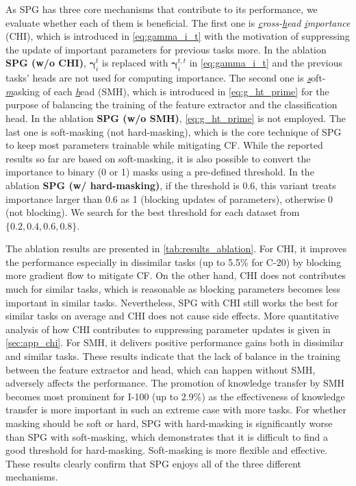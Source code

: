 As SPG has three core mechanisms that contribute to its performance, we evaluate whether each of them is beneficial.
The first one is \textit{\underline{c}ross-\underline{h}ead \underline{i}mportance} (CHI), which is introduced in \cref{eq:gamma_i_t} with the motivation of suppressing the update of important parameters for previous tasks more. In the ablation \textbf{SPG (w/o CHI)}, $\bm{\gamma}_i^t$ is replaced with $\bm{\gamma}_i^{t,t}$ in \cref{eq:gamma_i_t} and the previous tasks' heads are not used for computing importance.
The second one is \underline{\textit{s}}oft-\underline{\textit{m}}asking of each \underline{\textit{h}}ead (SMH), which is introduced in \cref{eq:g_ht_prime} for the purpose of balancing the training of the feature extractor and the classification head. In the ablation \textbf{SPG (w/o SMH)}, \cref{eq:g_ht_prime} is not employed.
The last one is soft-masking (not hard-masking), which is the core technique of SPG to keep most parameters trainable while mitigating CF. While the reported results so far are based on soft-masking, it is also possible to convert the importance to binary (0 or 1) masks using a pre-defined threshold. In the ablation \textbf{SPG (w/ hard-masking)}, if the threshold is 0.6, this variant treats importance larger than 0.6 as 1 (blocking updates of parameters), otherwise 0 (not blocking). We search for the best threshold for each dataset from $\{0.2,0.4,0.6,0.8\}$. 



The ablation results are presented in \cref{tab:results_ablation}.
For CHI, it improves the performance especially in dissimilar tasks (up to 5.5\% for C-20) by blocking more gradient flow to mitigate CF. On the other hand, CHI does not contributes much for similar tasks, which is reasonable as blocking parameters becomes less important in similar tasks. Nevertheless, 
SPG with CHI still works the best for similar tasks on average and CHI does not cause side effects. More quantitative analysis of how CHI contributes to suppressing parameter updates is given in \cref{sec:app_chi}.
For SMH, it delivers positive performance gains both in dissimilar and similar tasks. These results indicate that the lack of balance in the training between the feature extractor and head, which can happen without SMH, adversely affects the performance. The promotion of knowledge transfer by SMH becomes most prominent for I-100 (up to 2.9\%) as the effectiveness of knowledge transfer is more important in such an extreme case with more tasks.
For whether masking should be soft or hard, SPG with hard-masking is significantly worse than SPG with soft-masking, which demonstrates that it is difficult to find a good threshold for hard-masking. Soft-masking is more flexible and effective.
These results clearly confirm that SPG enjoys all of the three different mechanisms.
